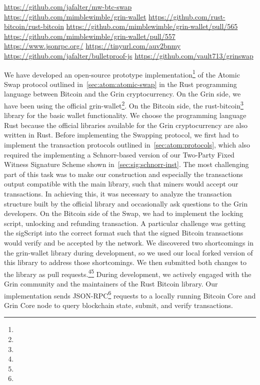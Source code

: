 \urldef\urlgithub\url{https://github.com/jafalter/mw-btc-swap}
\urldef\urlgrinwallet\url{https://github.com/mimblewimble/grin-wallet}
\urldef\urlrustbitcoin\url{https://github.com/rust-bitcoin/rust-bitcoin}
\urldef\urlprone\url{https://github.com/mimblewimble/grin-wallet/pull/565}
\urldef\urlprtwo\url{https://github.com/mimblewimble/grin-wallet/pull/557}
\urldef\urljsonrpc\url{https://www.jsonrpc.org/}
\urldef\urlrpbytes\url{https://tinyurl.com/auv2bnmy}
\urldef\urlbpjs\url{https://github.com/jafalter/bulletproof-js}
\urldef\urlgrnswp\url{https://github.com/vault713/grinswap}

We have developed an open-source prototype implementation\footnote{\urlgithub} of the Atomic Swap protocol outlined in~\cref{sec:atom:atomic-swap} in the Rust programming language between Bitcoin and the Grin cryptocurrency.
On the Grin side, we have been using the official grin-wallet\footnote{\urlgrinwallet}.
On the Bitcoin side, the rust-bitcoin\footnote{\urlrustbitcoin} library for the basic wallet functionality.
We choose the programming language Rust because the official libraries available for the Grin cryptocurrency are also written in Rust.
Before implementing the Swapping protocol, we first had to implement the transaction protocols outlined in~\cref{sec:atom:protocols}, which also required the implementing a Schnorr-based version of our Two-Party Fixed Witness Signature Scheme shown in~\cref{sec:sig:schnorr-inst}.
The most challenging part of this task was to make our construction and especially the transactions output compatible with the main library, such that miners would accept our transactions.
In achieving this, it was necessary to analyze the transaction structure built by the official library and occasionally ask questions to the Grin developers.
On the Bitcoin side of the Swap, we had to implement the locking script, unlocking and refunding transaction.
A particular challenge was getting the sigScript into the correct format such that the signed Bitcoin transactions would verify and be accepted by the network.
We discovered two shortcomings in the grin-wallet library during development, so we used our local forked version of this library to address those shortcomings.
We then submitted both changes to the library as pull requests.\footnote{\urlprone}\footnote{\urlprtwo}
During development, we actively engaged with the Grin community and the maintainers of the Rust Bitcoin library.
Our implementation sends JSON-RPC\footnote{\urljsonrpc} requests to a locally running Bitcoin Core and Grin Core node to query blockchain state, submit, and verify transactions.
